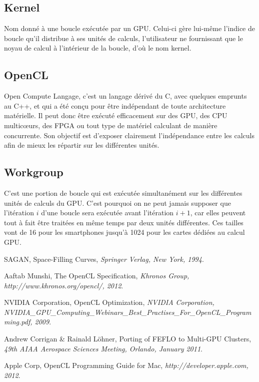 \documentclass[a4paper,12pt]{article}
\begin{document}
\subsection{Kernel}
Nom donné à une boucle exécutée par un GPU. Celui-ci gère lui-même l'indice de boucle qu'il distribue à ses unités de calculs, l'utilisateur ne fournissant que le noyau de calcul à l'intérieur de la boucle, d'où le nom kernel.

\subsection{OpenCL}
Open Compute Langage, c'est un langage dérivé du C, avec quelques emprunts au C++, et qui a été conçu pour être indépendant de toute architecture matérielle. Il peut donc être exécuté efficacement sur des GPU, des CPU multic\oe urs, des FPGA ou tout type de matériel calculant de manière concurrente. Son objectif est d'exposer clairement l'indépendance entre les calculs afin de mieux les répartir sur les différentes unités.

\subsection{Workgroup}
C'est une portion de boucle qui est exécutée simultanément sur les différentes unités de calculs du GPU. C'est pourquoi on ne peut jamais supposer que l'itération $i$ d'une boucle sera exécutée avant l'itération $i+1$, car elles peuvent tout à fait être traitées en même temps par deux unités différentes. Ces tailles vont de 16 pour les smartphones jusqu'à 1024 pour les cartes dédiées au calcul GPU.


%
%


\begin{thebibliography}{99}
\small

	SAGAN,
	Space-Filling Curves,
	\emph{Springer Verlag, New York, 1994}.

	Aaftab Munshi,
	The OpenCL Specification,
	\emph{Khronos Group, http://www.khronos.org/opencl/, 2012}.

	NVIDIA Corporation,
	OpenCL Optimization,
	\emph{NVIDIA Corporation, NVIDIA\_GPU\_Computing\_Webinars\_Best\_Practises\_For\_OpenCL\_Programming.pdf, 2009}.

	Andrew Corrigan \& Rainald Löhner,
	Porting of FEFLO to Multi-GPU Clusters,
	\emph{49th AIAA Aerospace Sciences Meeting, Orlando, January 2011}.

	Apple Corp,
	OpenCL Programming Guide for Mac,
	\emph{http://developer.apple.com, 2012}.



\end{thebibliography}
\end{document}
